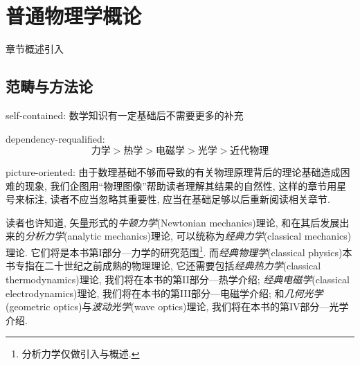 \chapter{普通物理学概论}\label{1}

章节概述引入

\section{范畴与方法论}\label{1-1}

self-contained: 数学知识有一定基础后不需要更多的补充

dependency-requalified: 
\[\text{力学}>\text{热学}>\text{电磁学}>\text{光学}>\text{近代物理}\]

picture-oriented: 由于数理基础不够而导致的有关物理原理背后的理论基础造成困难的现象, 我们企图用``物理图像''帮助读者理解其结果的自然性, 这样的章节用星号来标注, 读者不应当忽略其重要性, 应当在基础足够以后重新阅读相关章节.

读者也许知道, 矢量形式的\emph{牛顿力学}(Newtonian mechanics)理论, 和在其后发展出来的\emph{分析力学}(analytic mechanics)理论, 可以统称为\emph{经典力学}(classical mechanics)理论. 它们将是本书第I部分---力学的研究范围\footnote{分析力学仅做引入与概述.}. 而\emph{经典物理学}(classical physics)本书专指在二十世纪之前成熟的物理理论, 它还需要包括\emph{经典热力学}(classical thermodynamics)理论, 我们将在本书的第II部分---热学介绍; \emph{经典电磁学}(classical electrodynamics)理论, 我们将在本书的第III部分---电磁学介绍; 和\emph{几何光学}(geometric optics)与\emph{波动光学}(wave optics)理论, 我们将在本书的第IV部分---光学介绍.